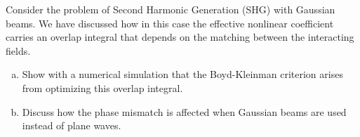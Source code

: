 %

\begin{exercicio}
Consider the problem of Second Harmonic Generation (SHG) with Gaussian beams. We have discussed how in this case the effective nonlinear coefficient carries an overlap integral that depends on the matching between the interacting fields.

\begin{enumerate}[a)]
    \item Show with a numerical simulation that the Boyd-Kleinman criterion arises from optimizing this overlap integral.
    \item Discuss how the phase mismatch is affected when Gaussian beams are used instead of plane waves.
\end{enumerate}
\end{exercicio}

